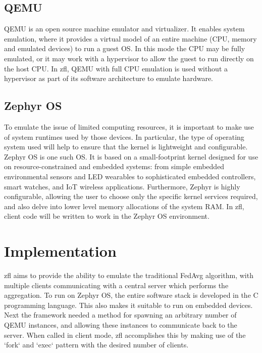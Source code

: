 \documentclass[12pt]{article}
\begin{document}
\subsection{QEMU}
QEMU\cite{} is an open source machine emulator and virtualizer. It enables system emulation, where it
provides a virtual model of an entire machine (CPU, memory and emulated devices) to run a guest OS.
In this mode the CPU may be fully emulated, or it may work with a hypervisor to allow the guest to
run directly on the host CPU. In zfl, QEMU with full CPU emulation is used without a hypervisor as
part of its software architecture to emulate hardware.

\subsection{Zephyr OS}
To emulate the issue of limited computing resources, it is important to make use of system runtimes
used by those devices. In particular, the type of operating system used will help to ensure that the kernel is
lightweight and configurable.
Zephyr OS\cite{} is one such OS. It is based on a small-footprint kernel designed for use on resource-constrained and embedded systems: from simple embedded environmental sensors and LED wearables to sophisticated embedded controllers, smart watches, and IoT wireless applications.
Furthermore, Zephyr is highly configurable, allowing the user to choose only the specific kernel
services required, and also delve into lower level memory allocations of the system RAM. In zfl,
client code will be written to work in the Zephyr OS environment.

\section{Implementation}
zfl aims to provide the ability to emulate the traditional FedAvg\cite{} algorithm, with multiple
clients communicating with a central server which performs the aggregation. To run on Zephyr OS, the entire software stack is developed in the C programming language. This also
makes it suitable to run on embedded devices.\\

Next the framework needed a method for spawning an arbitrary number of QEMU instances, and allowing
these instances to communicate back to the server. When called in client mode, zfl accomplishes this
by making use of the `fork` and `exec` pattern with the desired number of clients. \\
\end{document}
